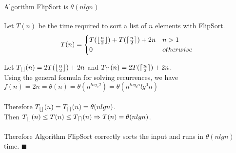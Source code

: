 \documentclass[12pt]{article}
\newenvironment{lemma}[2][Lemma]{\begin{trivlist}
\item[\hskip \labelsep {\bfseries #1}\hskip \labelsep {\bfseries #2.}]}{\end{trivlist}}
\newenvironment{question}[2][Question]{\begin{trivlist}
\item[\hskip \labelsep {\bfseries #1}\hskip \labelsep {\bfseries #2.}]}{\end{trivlist}}
\DeclarePairedDelimiter{\ceil}{\lceil}{\rceil}
\DeclarePairedDelimiter{\floor}{\lfloor}{\rfloor}
\begin{document}
\begin{question}{1 (a)}
  \begin{lemma}{1.4} Algorithm FlipSort is $\theta(nlgn)$ \\ \\
    Let $T(n)$ be the time required to sort a list of $n$ elements with FlipSort.\\
    \[
      T(n) = \begin{cases}
                T(\floor{\frac{n}{2}}) + T(\ceil{\frac{n}{2}}) + 2n & n > 1 \\
                0                                    & otherwise \\
             \end{cases}
    \]

    Let $T_{\floor{}}(n) = 2T(\floor{\frac{n}{2}}) + 2n$ and $T_{\ceil{}}(n) = 2T(\ceil{\frac{n}{2}}) + 2n$. \\
    Using the general formula for solving recurrences, we have\\
    $f(n) = 2n = \theta(n) = \theta(n^{log_{2}2}) = \theta(n^{log_{b}a}lg^{0}n)$\\ \\
    Therefore $T_{\floor{}}(n) = T_{\ceil{}}(n) = \theta(nlgn)$.\\
    Then $T_{\floor{}}(n) \leq T(n) \leq T_{\ceil{}}(n) \Rightarrow T(n) = \theta(nlgn)$. \\ \\
    Therefore Algorithm FlipSort correctly sorts the input and runs in $\theta(nlgn)$ time. $\blacksquare$
  \end{lemma}
\end{question}

\pagebreak
\end{document}
